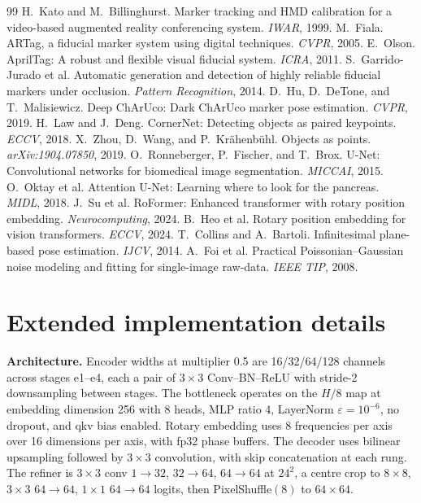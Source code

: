 \documentclass[10pt,twocolumn,letterpaper]{article}
\begin{document}
\begin{thebibliography}{99}\small
{} H.~Kato and M.~Billinghurst. Marker tracking and HMD calibration for a
video-based augmented reality conferencing system. \emph{IWAR}, 1999.
 M.~Fiala. ARTag, a fiducial marker system using digital techniques. \emph{CVPR},
2005.
 E.~Olson. AprilTag: A robust and flexible visual fiducial system. \emph{ICRA},
2011.
 S.~Garrido-Jurado et al. Automatic generation and detection of highly reliable
fiducial markers under occlusion. \emph{Pattern Recognition}, 2014.
 D.~Hu, D.~DeTone, and T.~Malisiewicz. Deep ChArUco: Dark ChArUco marker pose
estimation. \emph{CVPR}, 2019.
 H.~Law and J.~Deng. CornerNet: Detecting objects as paired keypoints.
\emph{ECCV}, 2018.
 X.~Zhou, D.~Wang, and P.~Kr\"ahenb\"uhl. Objects as points.
\emph{arXiv:1904.07850}, 2019.
 O.~Ronneberger, P.~Fischer, and T.~Brox. U-Net: Convolutional networks for
biomedical image segmentation. \emph{MICCAI}, 2015.
 O.~Oktay et al. Attention U-Net: Learning where to look for the pancreas.
\emph{MIDL}, 2018.
 J.~Su et al. RoFormer: Enhanced transformer with rotary position embedding.
\emph{Neurocomputing}, 2024.
 B.~Heo et al. Rotary position embedding for vision transformers. \emph{ECCV},
2024.
 T.~Collins and A.~Bartoli. Infinitesimal plane-based pose estimation. \emph{IJCV},
2014.
 A.~Foi et al. Practical Poissonian--Gaussian noise modeling and fitting for
single-image raw-data. \emph{IEEE TIP}, 2008.
\end{thebibliography}

\appendix
\onecolumn

\section{Extended implementation details}
\label{app:impl}

\textbf{Architecture.} Encoder widths at multiplier 0.5 are 16/32/64/128 channels across stages
e1--e4, each a pair of $3\times3$ Conv--BN--ReLU with stride-2 downsampling between stages. The
bottleneck operates on the $H/8$ map at embedding dimension 256 with 8 heads, MLP ratio 4,
LayerNorm $\varepsilon = 10^{-6}$, no dropout, and qkv bias enabled. Rotary embedding uses 8
frequencies per axis over 16 dimensions per axis, with fp32 phase buffers. The decoder uses
bilinear upsampling followed by $3\times3$ convolution, with skip concatenation at each rung. The
refiner is $3\times3$ conv $1\rightarrow32$, $32\rightarrow64$, $64\rightarrow64$ at $24^2$, a
centre crop to $8\times8$, $3\times3$ $64\rightarrow64$, $1\times1$ $64\rightarrow64$ logits, then
PixelShuffle$(8)$ to $64\times64$.
\end{document}

